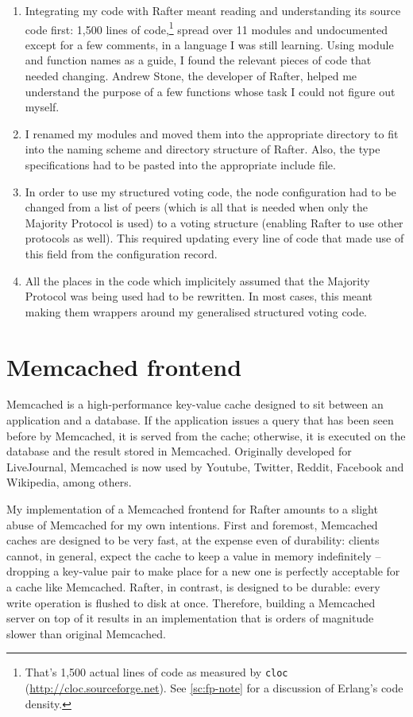 \documentclass[11pt,chapterprefix=true,toc=bibliography,numbers=noendperiod,
               footnotes=multiple,twoside]{scrreprt}
\begin{document}
\begin{enumerate}
    \item Integrating my code with Rafter meant reading and understanding its source code first: 1,500 lines of code,\footnote{That's 1,500 actual lines of code as measured by \texttt{cloc} (\url{http://cloc.sourceforge.net}). See \cref{sc:fp-note} for a discussion of Erlang's code density.} spread over 11 modules and undocumented except for a few comments, in a language I was still learning. Using module and function names as a guide, I found the relevant pieces of code that needed changing. Andrew Stone, the developer of Rafter, helped me understand the purpose of a few functions whose task I could not figure out myself.
    \item I renamed my modules and moved them into the appropriate directory to fit into the naming scheme and directory structure of Rafter. Also, the type specifications had to be pasted into the appropriate include file.
    \item In order to use my structured voting code, the node configuration had to be changed from a list of peers (which is all that is needed when only the Majority Protocol is used) to a voting structure (enabling Rafter to use other protocols as well). This required updating every line of code that made use of this field from the configuration record.
    \item All the places in the code which implicitely assumed that the Majority Protocol was being used had to be rewritten. In most cases, this meant making them wrappers around my generalised structured voting code.
\end{enumerate}

\section{Memcached frontend}

Memcached is a high-performance key-value cache designed to sit between an application and a database. If the application issues a query that has been seen before by Memcached, it is served from the cache; otherwise, it is executed on the database and the result stored in Memcached. Originally developed for LiveJournal, Memcached is now used by Youtube, Twitter, Reddit, Facebook and Wikipedia, among others.

My implementation of a Memcached frontend for Rafter amounts to a slight abuse of Memcached for my own intentions. First and foremost, Memcached caches are designed to be very fast, at the expense even of durability: clients cannot, in general, expect the cache to keep a value in memory indefinitely -- dropping a key-value pair to make place for a new one is perfectly acceptable for a cache like Memcached. Rafter, in contrast, is designed to be durable: every write operation is flushed to disk at once. Therefore, building a Memcached server on top of it results in an implementation that is orders of magnitude slower than original Memcached.
\end{document}
